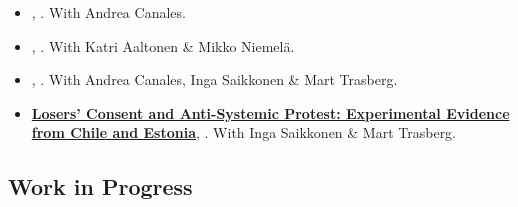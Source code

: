 	\begin{itemize}


	\item[\textcolor{gray}{\textbullet}] \href{https://github.com/hbahamonde/Exp_Vote_Selling/raw/main/Vote_Selling_Bahamonde_Canales_Paper_3.pdf}{{\bf \unskip}}, {\bf \emph{\unskip}}. With Andrea Canales.


	\item[\textcolor{gray}{\textbullet}] \href{https://github.com/hbahamonde/Fimea/blob/main/Fimea_paper.pdf?raw=1}{{\bf \unskip}}, {\bf \emph{\unskip}}. With Katri Aaltonen \& Mikko Niemelä.


	\item[\textcolor{gray}{\textbullet}] \href{https://raw.githubusercontent.com/hbahamonde/democratic_backsliding/main/2025/Dem_Backsliding_2.pdf}{{\bf \unskip}}, {\bf \emph{\unskip}}. With Andrea Canales, Inga Saikkonen \& Mart Trasberg.


\item[\textcolor{gray}{\textbullet}] \href{https://raw.githubusercontent.com/hbahamonde/democratic_backsliding/main/Losers_Consent_Final.pdf}{{\bf Losers' Consent and Anti-Systemic Protest: Experimental Evidence from Chile and Estonia}}, {\bf \emph{\unskip}}. With Inga Saikkonen \& Mart Trasberg.

  	\end{itemize}


\subsection*{Work in Progress}




